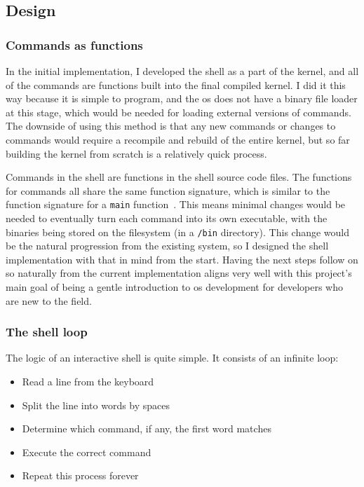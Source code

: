 \documentclass{article}
\begin{document}
\subsection{Design}

\subsubsection{Commands as functions}
In the initial implementation, I developed the shell as a part of the kernel,
and all of the commands are functions built into the final compiled kernel. I
did it this way because it is simple to program, and the \gls{os} does not have
a binary file loader at this stage, which would be needed for loading external
versions of commands. The downside of using this method is that any new
commands or changes to commands would require a recompile and rebuild of the
entire kernel, but so far building the kernel from scratch is a relatively
quick process.

Commands in the shell are functions in the shell source code files. The
functions for commands all share the same function signature, which is similar
to the function signature for a \texttt{main} function~\cite{c-main-func}. This
means minimal changes would be needed to eventually turn each command into its
own executable, with the binaries being stored on the filesystem (in a
\texttt{/bin} directory). This change would be the natural progression from the
existing system, so I designed the shell implementation with that in mind from
the start. Having the next steps follow on so naturally from the current
implementation aligns very well with this project's main goal of being a gentle
introduction to \gls{os} development for developers who are new to the field.

\subsubsection{The shell loop}
The logic of an interactive shell is quite simple. It consists of an infinite
loop:

\begin{itemize}
    \item Read a line from the keyboard
    \item Split the line into words by spaces
    \item Determine which command, if any, the first word matches
    \item Execute the correct command
    \item Repeat this process forever
\end{itemize}
\end{document}
